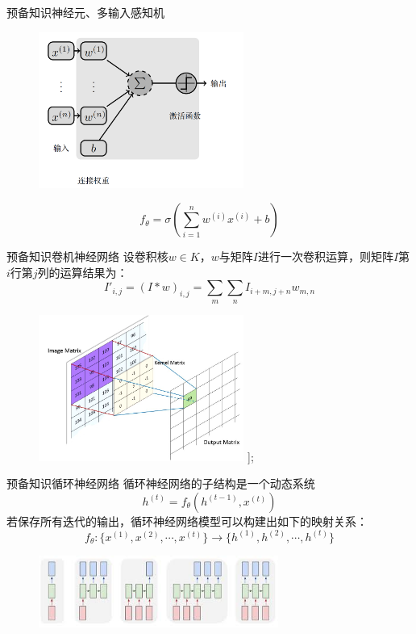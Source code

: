 \documentclass[table]{beamer}
\begin{document}
\begin{frame}{预备知识}{神经元、多输入感知机}
\begin{figure}
	\centering
	\includegraphics[width=0.6\textwidth]{pic/pptmlp}
\end{figure}
\begin{equation}
	f_{\theta}= \sigma(\sum_{i=1}^{n}w^{(i)}x^{(i)}+b)
\end{equation}
\end{frame}

\begin{frame}{预备知识}{卷机神经网络}
设卷积核$w\in K$，$w$与矩阵$I$进行一次卷积运算，则矩阵$I$第$i$行第$j$列的运算结果为：
\begin{equation}
	I'_{i,j}= (I*w)_{i,j}=\sum_{m}\sum_{n}I_{i+m,j+n}w_{m,n}
\end{equation}
\begin{figure}
	\centering
	\includegraphics[width=0.6\textwidth]{pic/pptcnn}
	];
\end{figure}
\end{frame}

\begin{frame}{预备知识}{循环神经网络}
循环神经网络的子结构是一个动态系统
\begin{equation}
	h^{(t)} = f_{\theta}(h^{(t-1)},x^{(t)})
\end{equation}
若保存所有迭代的输出，循环神经网络模型可以构建出如下的映射关系：
\begin{equation}
	f_{\theta}:\{x^{(1)},x^{(2)},\cdots,x^{(t)}\}\to \{h^{(1)},h^{(2)},\cdots,h^{(t)}\}
\end{equation}
\begin{figure}
	\centering
	\includegraphics[width=0.7\textwidth]{pic/pptrnn}
\end{figure}
\end{frame}
\end{document}
